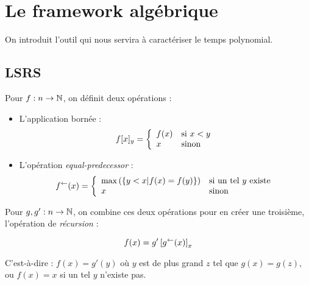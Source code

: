 	
	
	
	\section{Le framework algébrique} %
		\label{sec:framework_algebrique}
	
	On introduit l'outil qui nous servira à caractériser le temps polynomial.
	
		\subsection{LSRS} %
			\label{subsec:LSRS}
		
		
		
			\begin{definition}
				\label{def:app_bornee_eq_pred}
				Pour $f : n \to \mathbb{N}$, on définit deux opérations :
				
				\begin{itemize}
					\item 	L'application bornée :
					\[
						f[x]_y = \left\lbrace \begin{array}{ll} 
										f(x) & \text{si $x<y$} \\
										x 	& \text{sinon}
									 \end{array} \right.
					\]
					
					\item 	L'opération \emph{equal-predecessor} :
					\[
						f^{\leftarrow}(x) = \left\lbrace \begin{array}{ll} 
													\max\left(\left\lbrace y < x | f(x) = f(y)\right\rbrace\right) & \text{si un tel $y$ existe} \\
													x	& \text{sinon}
												 \end{array} \right.
					\]
				\end{itemize}
				
				Pour $g, g' : n \to \mathbb{N}$, on combine ces deux opérations pour en créer une troisième, l'opération de \emph{récursion} :
				
				\[
					f(x) = g'\left[ g^{\leftarrow}(x) \right]_{x}
				\]
				
				C'est-à-dire : $f(x) = g'(y)$ où $y$ est de plus grand $z$ tel que $g(x) = g(z)$, ou $f(x) = x$ si un tel $y$ n'existe pas.
			\end{definition}
			
